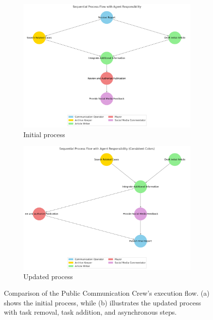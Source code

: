 \begin{figure}[htbp]
    \centering
    \begin{subfigure}[b]{0.49\textwidth}
        \centering
        \includegraphics[width=\textwidth]{figures/PC-process.png}
        \caption{Initial process}
        \label{fig:initial_process}
    \end{subfigure}
    \hfill
    \begin{subfigure}[b]{0.49\textwidth}
        \centering
        \includegraphics[width=\textwidth]{figures/PC-process-updated.png}
        \caption{Updated process}
        \label{fig:updated_process}
    \end{subfigure}
    \caption{Comparison of the Public Communication Crew's execution flow. (a) shows the initial process, while (b) illustrates the updated process with task removal, task addition, and asynchronous steps.}
    \label{fig:exc_flow_pc_comparison}
\end{figure}

